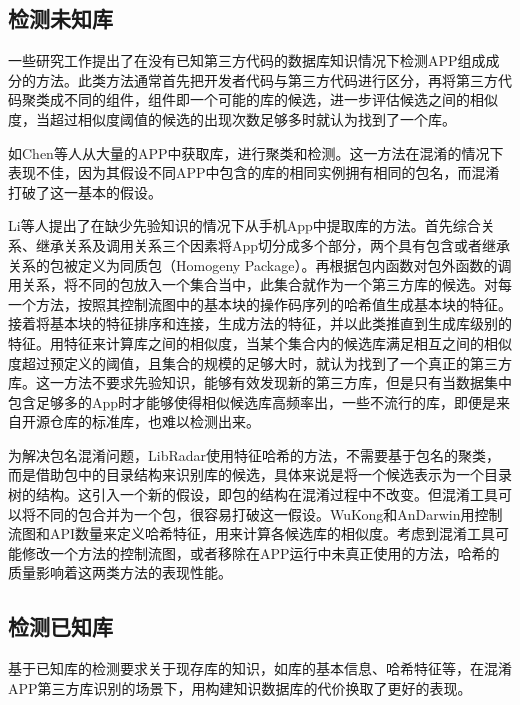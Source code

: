 \subsection{检测未知库}

一些研究工作提出了在没有已知第三方代码的数据库知识情况下检测APP组成成分的方法。此类方法通常首先把开发者代码与第三方代码进行区分，再将第三方代码聚类成不同的组件，组件即一个可能的库的候选，进一步评估候选之间的相似度，当超过相似度阈值的候选的出现次数足够多时就认为找到了一个库。

如Chen等人\cite{chen2016following}从大量的APP中获取库，进行聚类和检测。这一方法在混淆的情况下表现不佳，因为其假设不同APP中包含的库的相同实例拥有相同的包名，而混淆打破了这一基本的假设。

Li等人\cite{li2018large}提出了在缺少先验知识的情况下从手机App中提取库的方法。首先综合关系、继承关系及调用关系三个因素将App切分成多个部分，两个具有包含或者继承关系的包被定义为{\kaishu 同质包}（Homogeny Package）。再根据包内函数对包外函数的调用关系，将不同的包放入一个集合当中，此集合就作为一个第三方库的候选。对每一个方法，按照其控制流图中的基本块的操作码序列的哈希值生成基本块的特征。接着将基本块的特征排序和连接，生成方法的特征，并以此类推直到生成库级别的特征。用特征来计算库之间的相似度，当某个集合内的候选库满足相互之间的相似度超过预定义的阈值，且集合的规模的足够大时，就认为找到了一个真正的第三方库。这一方法不要求先验知识，能够有效发现新的第三方库，但是只有当数据集中包含足够多的App时才能够使得相似候选库高频率出，一些不流行的库，即便是来自开源仓库的标准库，也难以检测出来。



为解决包名混淆问题，LibRadar\cite{ma2016libradar}使用特征哈希的方法，不需要基于包名的聚类，而是借助包中的目录结构来识别库的候选，具体来说是将一个候选表示为一个目录树的结构。这引入一个新的假设，即包的结构在混淆过程中不改变。但混淆工具可以将不同的包合并为一个包，很容易打破这一假设。WuKong\cite{wang2015wukong}和AnDarwin\cite{crussell2014andarwin}用控制流图和API数量来定义哈希特征，用来计算各候选库的相似度。考虑到混淆工具可能修改一个方法的控制流图，或者移除在APP运行中未真正使用的方法，哈希的质量影响着这两类方法的表现性能。


\subsection{检测已知库}

基于已知库的检测要求关于现存库的知识，如库的基本信息、哈希特征等，在混淆APP第三方库识别的场景下，用构建知识数据库的代价换取了更好的表现。

